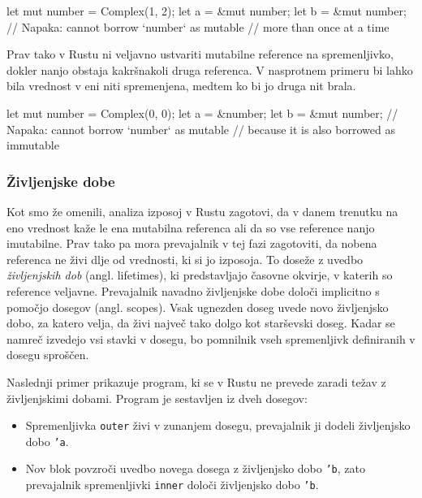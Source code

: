 \begin{rust-failure}
let mut number = Complex(1, 2);
let a = &mut number;
let b = &mut number;  // Napaka: cannot borrow `number` as mutable
                      // more than once at a time
\end{rust-failure}

Prav tako v Rustu ni veljavno ustvariti mutabilne reference na spremenljivko, dokler nanjo obstaja kakršnakoli druga referenca. V nasprotnem primeru bi lahko bila vrednost v eni niti spremenjena, medtem ko bi jo druga nit brala.

\begin{rust-failure}
let mut number = Complex(0, 0);
let a = &number;
let b = &mut number;  // Napaka: cannot borrow `number` as mutable
                      // because it is also borrowed as immutable
\end{rust-failure}

%

\subsubsection{Življenjske dobe}

Kot smo že omenili, analiza izposoj v Rustu zagotovi, da v danem trenutku na eno vrednost kaže le ena mutabilna referenca ali da so vse reference nanjo imutabilne. Prav tako pa mora prevajalnik v tej fazi zagotoviti, da nobena referenca ne živi dlje od vrednosti, ki si jo izposoja. To doseže z uvedbo \textit{življenjskih dob} (angl. lifetimes), ki predstavljajo časovne okvirje, v katerih so reference veljavne. Prevajalnik navadno življenjske dobe določi implicitno s pomočjo dosegov (angl. scopes). Vsak ugnezden doseg uvede novo življenjsko dobo, za katero velja, da živi največ tako dolgo kot starševski doseg. Kadar se namreč izvedejo vsi stavki v dosegu, bo pomnilnik vseh spremenljivk definiranih v dosegu sproščen.

Naslednji primer prikazuje program, ki se v Rustu ne prevede zaradi težav z življenjskimi dobami. Program je sestavljen iz dveh dosegov:
\begin{itemize}
	\itemsep 0em
	\item Spremenljivka \texttt{outer} živi v zunanjem dosegu, prevajalnik ji dodeli življenjsko dobo \texttt{'a}.
	\item Nov blok povzroči uvedbo novega dosega z življenjsko dobo \texttt{'b}, zato prevajalnik spremenljivki \texttt{inner} določi življenjsko dobo \texttt{'b}.
\end{itemize}

